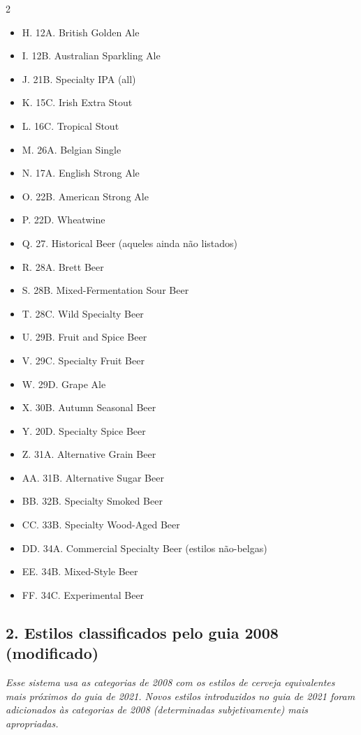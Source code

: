 \begin{multicols*}{2}
\begin{itemize}[noitemsep]
\begin{itemize}
  \item[] H. 12A. British Golden Ale
  \item[] I. 12B. Australian Sparkling Ale
  \item[] J. 21B. Specialty IPA (all)
  \item[] K. 15C. Irish Extra Stout
  \item[] L. 16C. Tropical Stout
  \item[] M. 26A. Belgian Single
  \item[] N. 17A. English Strong Ale
  \item[] O. 22B. American Strong Ale
  \item[] P. 22D. Wheatwine
  \item[] Q. 27. Historical Beer (aqueles ainda não listados)
  \item[] R. 28A. Brett Beer
  \item[] S. 28B. Mixed-Fermentation Sour Beer
  \item[] T. 28C. Wild Specialty Beer
  \item[] U. 29B. Fruit and Spice Beer
  \item[] V. 29C. Specialty Fruit Beer
  \item[] W. 29D. Grape Ale
  \item[] X. 30B. Autumn Seasonal Beer
  \item[] Y. 20D. Specialty Spice Beer
  \item[] Z. 31A. Alternative Grain Beer
  \item[] AA. 31B. Alternative Sugar Beer
  \item[] BB. 32B. Specialty Smoked Beer
  \item[] CC. 33B. Specialty Wood-Aged Beer
  \item[] DD. 34A. Commercial Specialty Beer (estilos não-belgas)
  \item[] EE. 34B. Mixed-Style Beer
  \item[] FF. 34C. Experimental Beer
\end{itemize}
\end{itemize}

\subsection*{2. Estilos classificados pelo guia 2008 (modificado)}

\textit{Esse sistema usa as categorias de 2008 com os estilos de cerveja equivalentes mais próximos do guia de 2021. Novos estilos introduzidos no guia de 2021 foram adicionados às categorias de 2008 (determinadas subjetivamente) mais apropriadas.}


\end{multicols*}
